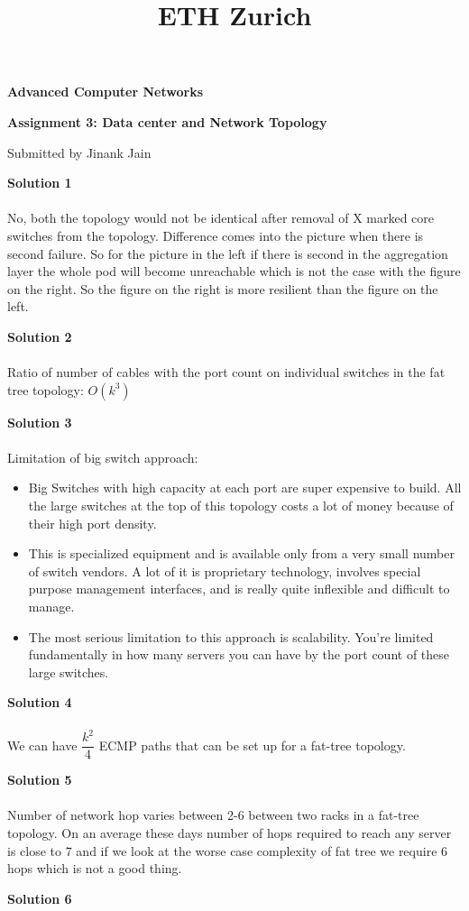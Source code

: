 \documentclass[letterpaper, 11pt]{article}
\title{ETH Zurich}
\begin{document}

\begin{center}
\Large \bf Advanced Computer Networks

\Large \bf Assignment 3: Data center and Network Topology

\large Submitted by Jinank Jain
\end{center}

\textbf{Solution 1}\\ \\
No, both the topology would not be identical after removal of X marked core switches from the topology. Difference comes into the picture when there is second failure. So for the picture in the left if there is second in the aggregation layer the whole pod will become unreachable which is not the case with the figure on the right. So the figure on the right is more resilient than the figure on the left.
\bigskip

\textbf{Solution 2}\\ \\
Ratio of number of cables with the port count on individual switches in the fat tree topology: $O(k^3)$ 
\bigskip

\textbf{Solution 3}\\ \\
Limitation of big switch approach: 
\begin{itemize}
	\item Big Switches with high capacity at each port are super expensive to build.  All the large switches at the top of this topology costs a lot of money because of their high port density. 
	\item This is specialized equipment and is available only from a very small number of switch vendors. A lot of it is proprietary technology, involves special purpose management interfaces, and is really quite inflexible and difficult to manage.
	\item The most serious limitation to this approach is scalability. You're limited fundamentally in how many servers you can have by the port count of these large switches.
\end{itemize}
\bigskip

\textbf{Solution 4}\\ \\
We can have $\dfrac{k^2}{4}$ ECMP paths that can be set up for a fat-tree topology.
\bigskip


\textbf{Solution 5}\\ \\
Number of network hop varies between 2-6 between two racks in a fat-tree topology. On an average these days number of hops required to reach any server is close to 7 and if we look at the worse case complexity of fat tree we require 6 hops which is not a good thing.
\bigskip

\textbf{Solution 6}\\ \\

\bigskip

\clearpage

\end{document}
